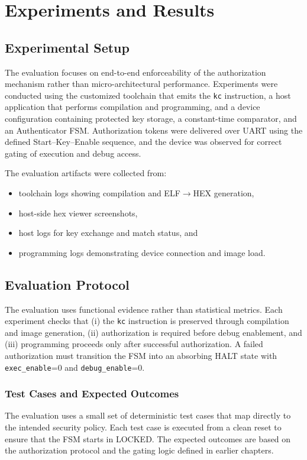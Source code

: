 \chapter{Experiments and Results}
\label{chapter5}

\section{Experimental Setup}
The evaluation focuses on end-to-end enforceability of the authorization mechanism rather than
micro-architectural performance. Experiments were conducted using the customized toolchain that
emits the \texttt{kc} instruction, a host application that performs compilation and programming,
and a device configuration containing protected key storage, a constant-time comparator, and an
Authenticator FSM. Authorization tokens were delivered over UART using the defined Start–Key–Enable
sequence, and the device was observed for correct gating of execution and debug access.

The evaluation artifacts were collected from:
\begin{itemize}
  \item toolchain logs showing compilation and ELF$\rightarrow$HEX generation,
  \item host-side hex viewer screenshots,
  \item host logs for key exchange and match status, and
  \item programming logs demonstrating device connection and image load.
\end{itemize}

\section{Evaluation Protocol}
The evaluation uses functional evidence rather than statistical metrics. Each experiment checks
that (i) the \texttt{kc} instruction is preserved through compilation and image generation, (ii)
authorization is required before debug enablement, and (iii) programming proceeds only after
successful authorization. A failed authorization must transition the FSM into an absorbing
\textsf{HALT} state with \texttt{exec\_enable}=0 and \texttt{debug\_enable}=0.

\subsection{Test Cases and Expected Outcomes}
The evaluation uses a small set of deterministic test cases that map directly to the intended
security policy. Each test case is executed from a clean reset to ensure that the FSM starts
in \textsf{LOCKED}. The expected outcomes are based on the authorization protocol and the
gating logic defined in earlier chapters.

